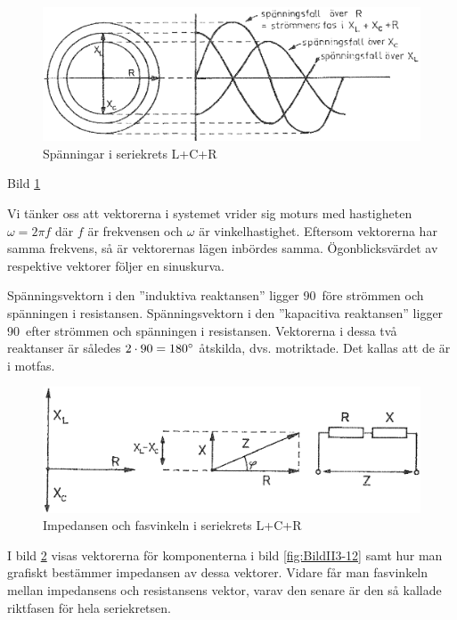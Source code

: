 \begin{figure}
\includegraphics[width=\textwidth]{images/cropped_pdfs/bild_2_3-13.pdf}
\caption{Spänningar i seriekrets L+C+R}
\label{fig:BildII3-13}
\end{figure}

Bild \ref{fig:BildII3-13}

Vi tänker oss att vektorerna i systemet vrider sig moturs med hastigheten
\(\omega = 2\pi f\) där \(f\) är frekvensen och \(\omega\) är vinkelhastighet.
Eftersom vektorerna har samma frekvens, så är vektorernas lägen inbördes samma.
Ögonblicksvärdet av respektive vektorer följer en sinuskurva.

Spänningsvektorn i den ''induktiva reaktansen'' ligger 90\degree~före strömmen
och spänningen i resistansen.
Spänningsvektorn i den ''kapacitiva reaktansen'' ligger 90\degree~efter
strömmen och spänningen i resistansen.
Vektorerna i dessa två reaktanser är således \(2 \cdot 90 = 180\degree\)
åtskilda, dvs. motriktade.
Det kallas att de är i motfas.

\begin{figure}
\includegraphics[width=\textwidth]{images/cropped_pdfs/bild_2_3-14.pdf}
\caption{Impedansen och fasvinkeln i seriekrets L+C+R}
\label{fig:BildII3-14}
\end{figure}

I bild \ref{fig:BildII3-14} visas vektorerna för komponenterna i bild
\ref{fig:BildII3-12} samt hur man grafiskt bestämmer impedansen av dessa
vektorer.
Vidare får man fasvinkeln mellan impedansens och resistansens vektor, varav den
senare är den så kallade riktfasen för hela seriekretsen.

